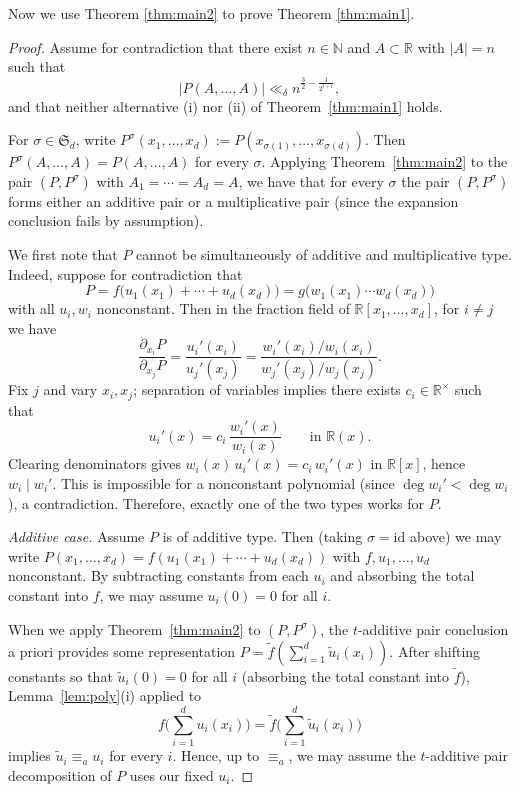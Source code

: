\documentclass[12pt,reqno]{amsart}
\numberwithin{equation}{section}
\begin{document}
Now we use Theorem \ref{thm:main2} to prove Theorem \ref{thm:main1}.
\begin{proof}
Assume for contradiction that there exist $n\in\mathbb N$ and $A\subset\mathbb R$ with $|A|=n$ such that
$$|P(A,\ldots,A)|\ll_{\delta} n^{\frac32-\frac1{2^{t+1}}},$$
and that neither alternative (i) nor (ii) of Theorem~\ref{thm:main1} holds.

For $\sigma\in\mathfrak S_d$, write
$P^{\sigma}(x_1,\ldots,x_d):=P(x_{\sigma(1)},\ldots,x_{\sigma(d)})$.
Then $P^{\sigma}(A,\ldots,A)=P(A,\ldots,A)$ for every $\sigma$.
Applying Theorem~\ref{thm:main2} to the pair $(P,P^{\sigma})$ with $A_1=\cdots=A_d=A$, we have that for every $\sigma$
the pair $(P,P^{\sigma})$ forms either an additive pair or a multiplicative pair (since the expansion conclusion fails by assumption).

We first note that $P$ cannot be simultaneously of additive and multiplicative type.
Indeed, suppose for contradiction that
\[
P=f\big(u_1(x_1)+\cdots+u_d(x_d)\big)=g\big(w_1(x_1)\cdots w_d(x_d)\big)
\]
with all $u_i,w_i$ nonconstant.
Then in the fraction field of $\mathbb R[x_1,\ldots,x_d]$, for $i\neq j$ we have
\[
\frac{\partial_{x_i}P}{\partial_{x_j}P}
=\frac{u_i'(x_i)}{u_j'(x_j)}
=\frac{w_i'(x_i)/w_i(x_i)}{w_j'(x_j)/w_j(x_j)}.
\]
Fix $j$ and vary $x_i,x_j$; separation of variables implies there exists $c_i\in\mathbb R^\times$ such that
\[
u_i'(x)=c_i\,\frac{w_i'(x)}{w_i(x)}\qquad\text{in }\mathbb R(x).
\]
Clearing denominators gives $w_i(x)\,u_i'(x)=c_i\,w_i'(x)$ in $\mathbb R[x]$, hence $w_i\mid w_i'$.
This is impossible for a nonconstant polynomial (since $\deg w_i'<\deg w_i$), a contradiction.
Therefore, exactly one of the two types works for $P$.

\smallskip
\noindent\emph{Additive case.}
Assume $P$ is of additive type. Then (taking $\sigma=\mathrm{id}$ above) we may write
$P(x_1,\ldots,x_d)=f(u_1(x_1)+\cdots+u_d(x_d))$
with $f,u_1,\ldots,u_d$ nonconstant.
By subtracting constants from each $u_i$ and absorbing the total constant into $f$,
we may assume $u_i(0)=0$ for all $i$.


When we apply Theorem~\ref{thm:main2} to $(P,P^\sigma)$, the $t$-additive pair conclusion a priori provides
some representation $P=\widetilde f(\sum_{i=1}^d \widetilde u_i(x_i))$.
After shifting constants so that $\widetilde u_i(0)=0$ for all $i$ (absorbing the total constant into $\widetilde f$),
Lemma~\ref{lem:poly}(i) applied to
\[
f\Big(\sum_{i=1}^d u_i(x_i)\Big)=\widetilde f\Big(\sum_{i=1}^d \widetilde u_i(x_i)\Big)
\]
implies $\widetilde u_i\equiv_a u_i$ for every $i$.
Hence, up to $\equiv_a$, we may assume the $t$-additive pair decomposition of $P$ uses our fixed $u_i$.





\end{proof}
\end{document}
